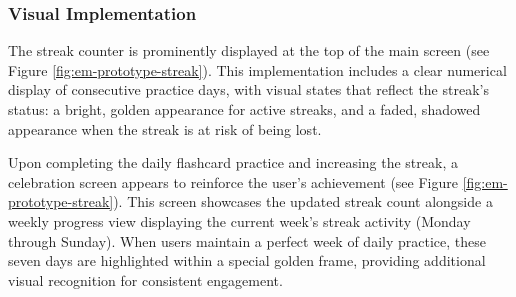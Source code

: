\subsubsection{Visual Implementation}

The streak counter is prominently displayed at the top of the main screen (see Figure \ref{fig:em-prototype-streak}). This implementation includes a clear numerical display of consecutive practice days, with visual states that reflect the streak's status: a bright, golden appearance for active streaks, and a faded, shadowed appearance when the streak is at risk of being lost.

Upon completing the daily flashcard practice and increasing the streak, a celebration screen appears to reinforce the user's achievement (see Figure \ref{fig:em-prototype-streak}). This screen showcases the updated streak count alongside a weekly progress view displaying the current week's streak activity (Monday through Sunday). When users maintain a perfect week of daily practice, these seven days are highlighted within a special golden frame, providing additional visual recognition for consistent engagement.

\newpage


